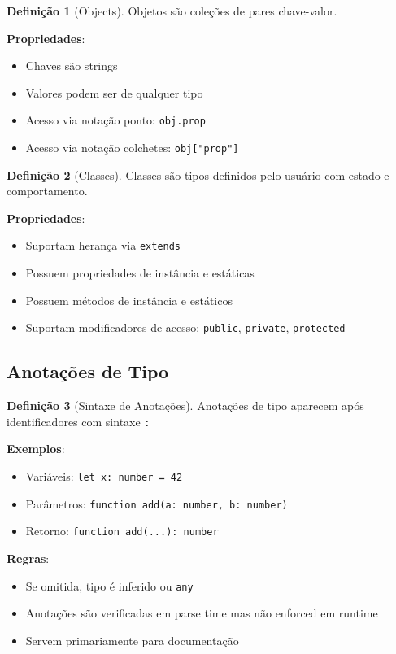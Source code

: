 \documentclass[12pt,a4paper]{article}
\theoremstyle{definition}
\newtheorem{definition}{Definição}[section]
\begin{document}
\begin{definition}[Objects]
Objetos são coleções de pares chave-valor.

\textbf{Propriedades}:
\begin{itemize}
    \item Chaves são strings
    \item Valores podem ser de qualquer tipo
    \item Acesso via notação ponto: \texttt{obj.prop}
    \item Acesso via notação colchetes: \texttt{obj["prop"]}
\end{itemize}
\end{definition}

\begin{definition}[Classes]
Classes são tipos definidos pelo usuário com estado e comportamento.

\textbf{Propriedades}:
\begin{itemize}
    \item Suportam herança via \texttt{extends}
    \item Possuem propriedades de instância e estáticas
    \item Possuem métodos de instância e estáticos
    \item Suportam modificadores de acesso: \texttt{public}, \texttt{private}, \texttt{protected}
\end{itemize}
\end{definition}

\subsection{Anotações de Tipo}

\begin{definition}[Sintaxe de Anotações]
Anotações de tipo aparecem após identificadores com sintaxe \texttt{:}

\textbf{Exemplos}:
\begin{itemize}[noitemsep]
    \item Variáveis: \texttt{let x: number = 42}
    \item Parâmetros: \texttt{function add(a: number, b: number)}
    \item Retorno: \texttt{function add(...): number}
\end{itemize}

\textbf{Regras}:
\begin{itemize}
    \item Se omitida, tipo é inferido ou \texttt{any}
    \item Anotações são verificadas em parse time mas não enforced em runtime
    \item Servem primariamente para documentação
\end{itemize}
\end{definition}
\end{document}
